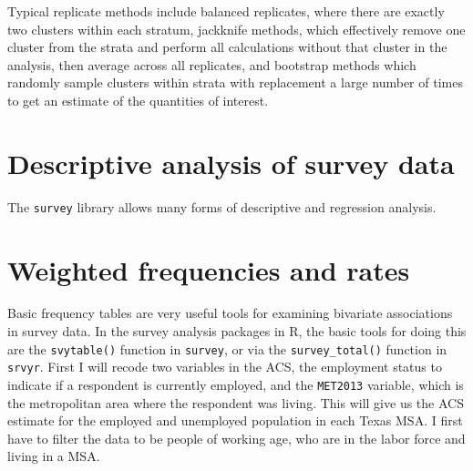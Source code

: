 \documentclass[
  letterpaper,
  DIV=11,
  numbers=noendperiod]{scrreprt}
\begin{document}
Typical replicate methods include balanced replicates, where there are
exactly two clusters within each stratum, jackknife methods, which
effectively remove one cluster from the strata and perform all
calculations without that cluster in the analysis, then average across
all replicates, and bootstrap methods which randomly sample clusters
within strata with replacement a large number of times to get an
estimate of the quantities of interest.

\hypertarget{descriptive-analysis-of-survey-data}{%
\section{Descriptive analysis of survey
data}\label{descriptive-analysis-of-survey-data}}

The \texttt{survey} library allows many forms of descriptive and
regression analysis.

\hypertarget{weighted-frequencies-and-rates}{%
\section{Weighted frequencies and
rates}\label{weighted-frequencies-and-rates}}

Basic frequency tables are very useful tools for examining bivariate
associations in survey data. In the survey analysis packages in R, the
basic tools for doing this are the \texttt{svytable()} function in
\texttt{survey}, or via the \texttt{survey\_total()} function in
\texttt{srvyr}. First I will recode two variables in the ACS, the
employment status to indicate if a respondent is currently employed, and
the \texttt{MET2013} variable, which is the metropolitan area where the
respondent was living. This will give us the ACS estimate for the
employed and unemployed population in each Texas MSA. I first have to
filter the data to be people of working age, who are in the labor force
and living in a MSA.
\end{document}
